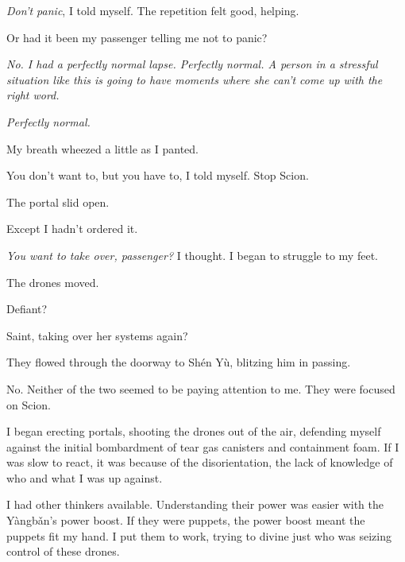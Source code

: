 \emph{Don't panic}, I told myself.  The repetition felt good, helping.



Or had it been my passenger telling me not to panic?



\emph{No.  I had a perfectly normal lapse.  Perfectly normal.  A person in a stressful situation like this is going to have moments where she can't come up with the right word.}



\emph{Perfectly normal.}



My breath wheezed a little as I panted.



You don't want to, but you have to, I told myself.  Stop Scion.



The portal slid open.



Except I hadn't ordered it.



\emph{You want to take over, passenger?}  I thought.  I began to struggle to my feet.



The drones moved.



Defiant?



Saint, taking over her systems again?



They flowed through the doorway to Sh\'{e}n Y\`{u}, blitzing him in passing.



No.  Neither of the two seemed to be paying attention to me.  They were focused on Scion.



I began erecting portals, shooting the drones out of the air, defending myself against the initial bombardment of tear gas canisters and containment foam.  If I was slow to react, it was because of the disorientation, the lack of knowledge of who and what I was up against.



I had other thinkers available.  Understanding their power was easier with the Y\`{a}ngb\v{a}n's power boost.  If they were puppets, the power boost meant the puppets fit my hand.  I put them to work, trying to divine just who was seizing control of these drones.



